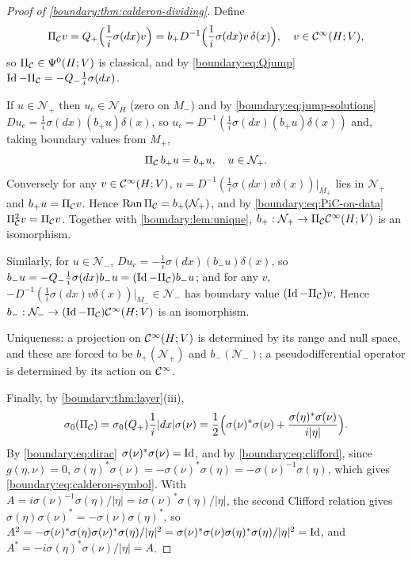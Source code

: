 \begin{proof}[Proof of \cref{boundary:thm:calderon-dividing}]
Define
\begin{equation}\label{boundary:eq:PiC-def}
\Pi_{\mathcal{C}} v=Q_+\Big(\frac1i\sigma(dx)v\Big)=b_+D^{-1}\Big(\frac1i\sigma(dx)v\,\delta(x)\Big),
\quad v\in\mathcal{C}^\infty(H;V),
\end{equation}
so $\Pi_{\mathcal{C}}\in\Psi^{0}(H;V)$ is classical, and by \eqref{boundary:eq:Qjump}
$\operatorname{Id}-\Pi_{\mathcal{C}}=-Q_-\frac1i\sigma(dx)$.

If $u\in\mathcal{N}_+$ then $u_c\in\mathcal{N}_H$ (zero on $M_-$) and by
\eqref{boundary:eq:jump-solutions} $Du_c=\frac1i\sigma(dx)(b_+u)\delta(x)$, so
$u_c=D^{-1}(\frac1i\sigma(dx)(b_+u)\delta(x))$ and, taking boundary values from
$M_+$,
\begin{equation}\label{boundary:eq:PiC-on-data}
\Pi_{\mathcal{C}}\,b_+u=b_+u,\quad u\in\mathcal{N}_+.
\end{equation}
Conversely for any $v\in\mathcal{C}^\infty(H;V)$, $u=D^{-1}(\frac1i\sigma(dx)v\delta(x))|_{M_+}$
lies in $\mathcal{N}_+$ and $b_+u=\Pi_{\mathcal{C}} v$. Hence $\operatorname{Ran}\Pi_{\mathcal{C}}=b_+(\mathcal{N}_+)$, and
by \eqref{boundary:eq:PiC-on-data} $\Pi_{\mathcal{C}}^2v=\Pi_{\mathcal{C}} v$. Together with
\cref{boundary:lem:unique}, $b_+:\mathcal{N}_+\to\Pi_{\mathcal{C}}\mathcal{C}^\infty(H;V)$ is an isomorphism.

Similarly, for $u\in\mathcal{N}_-$, $Du_c=-\frac1i\sigma(dx)(b_-u)\delta(x)$, so
$b_-u=-Q_-\frac1i\sigma(dx)b_-u=(\operatorname{Id}-\Pi_{\mathcal{C}})b_-u$; and for any $v$, $-D^{-1}(\frac1i
\sigma(dx)v\delta(x))|_{M_-}\in\mathcal{N}_-$ has boundary value $(\operatorname{Id}-\Pi_{\mathcal{C}})v$. Hence
$b_-:\mathcal{N}_-\to(\operatorname{Id}-\Pi_{\mathcal{C}})\mathcal{C}^\infty(H;V)$ is an isomorphism.

Uniqueness: a projection on $\mathcal{C}^\infty(H;V)$ is determined by its range and null space,
and these are forced to be $b_+(\mathcal{N}_+)$ and $b_-(\mathcal{N}_-)$; a
pseudodifferential operator is determined by its action on $\mathcal{C}^\infty$.

Finally, by \cref{boundary:thm:layer}(iii),
\begin{equation*}
\sigma_0(\Pi_{\mathcal{C}})=\sigma_0(Q_+)\frac1i|dx|\sigma(\nu)=\frac12\Big(\sigma(\nu)^*\sigma(\nu)+
\frac{\sigma(\eta)^*\sigma(\nu)}{i|\eta|}\Big).
\end{equation*} By \eqref{boundary:eq:dirac} $\sigma(\nu)^*\sigma(\nu)=\operatorname{Id}$, and by
\eqref{boundary:eq:clifford}, since $g(\eta,\nu)=0$,
$\sigma(\eta)^*\sigma(\nu)=-\sigma(\nu)^*\sigma(\eta)=-\sigma(\nu)^{-1}\sigma(\eta)$,
which gives \eqref{boundary:eq:calderon-symbol}. With $A=i\sigma(\nu)^{-1}\sigma(\eta)/
|\eta|=i\sigma(\nu)^*\sigma(\eta)/|\eta|$, the second Clifford relation gives
$\sigma(\eta)\sigma(\nu)^*=-\sigma(\nu)\sigma(\eta)^*$, so $A^2=-\sigma(\nu)^*\sigma(\eta)
\sigma(\nu)^*\sigma(\eta)/|\eta|^2=\sigma(\nu)^*\sigma(\nu)\sigma(\eta)^*\sigma(\eta)/
|\eta|^2=\operatorname{Id}$, and $A^*=-i\sigma(\eta)^*\sigma(\nu)/|\eta|=A$.
\end{proof}

